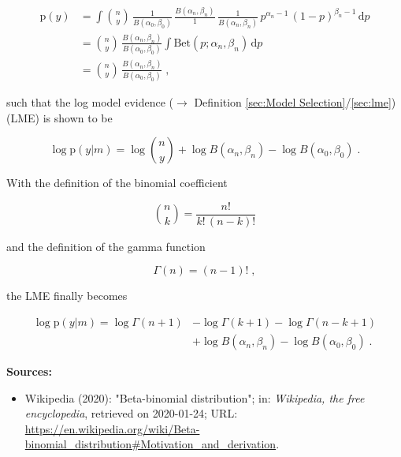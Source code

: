 \documentclass[a4paper,12pt,twoside]{book}
\begin{document}
\begin{equation} \label{eq:bin-lme-Bin-ME-s2}
\begin{split}
\mathrm{p}(y) &= \int {n \choose y} \, \frac{1}{B(\alpha_0,\beta_0)} \, \frac{B(\alpha_n,\beta_n)}{1} \, \frac{1}{B(\alpha_n,\beta_n)} \, p^{\alpha_n-1} \, (1-p)^{\beta_n-1} \, \mathrm{d}p \\
&= {n \choose y} \, \frac{B(\alpha_n,\beta_n)}{B(\alpha_0,\beta_0)} \int \mathrm{Bet}(p; \alpha_n, \beta_n) \, \mathrm{d}p \\
&= {n \choose y} \, \frac{B(\alpha_n,\beta_n)}{B(\alpha_0,\beta_0)} \; ,
\end{split}
\end{equation}

such that the log model evidence ($\rightarrow$ Definition \ref{sec:Model Selection}/\ref{sec:lme}) (LME) is shown to be

\begin{equation} \label{eq:bin-lme-Bin-LME-s1}
\log \mathrm{p}(y|m) = \log {n \choose y} + \log B(\alpha_n,\beta_n) - \log B(\alpha_0,\beta_0) \; .
\end{equation}

With the definition of the binomial coefficient

\begin{equation} \label{eq:bin-lme-bin-coeff}
{n \choose k} = \frac{n!}{k! \, (n-k)!}
\end{equation}

and the definition of the gamma function

\begin{equation} \label{eq:bin-lme-gam-fct}
\Gamma(n) = (n-1)! \; ,
\end{equation}

the LME finally becomes

\begin{equation} \label{eq:bin-lme-Bin-LME-s2}
\begin{split}
\log \mathrm{p}(y|m) = \log \Gamma(n+1) &- \log \Gamma(k+1) - \log \Gamma(n-k+1) \\
&+ \log B(\alpha_n,\beta_n) - \log B(\alpha_0,\beta_0) \; .
\end{split}
\end{equation}


\vspace{1em}
\textbf{Sources:}
\begin{itemize}
\item Wikipedia (2020): "Beta-binomial distribution"; in: \textit{Wikipedia, the free encyclopedia}, retrieved on 2020-01-24; URL: \url{https://en.wikipedia.org/wiki/Beta-binomial_distribution#Motivation_and_derivation}.
\end{itemize}
\end{document}
